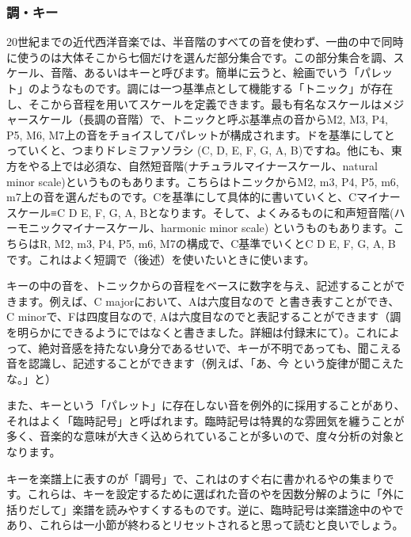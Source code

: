 \documentclass[11pt]{ltjarticle}
\newcommand{\wc}{\writechord}
\begin{document}
\subsubsection{調・キー}
20世紀までの近代西洋音楽では、半音階のすべての音を使わず、一曲の中で同時に使うのは大体そこから七個だけを選んだ部分集合です。この部分集合を調、スケール、音階、あるいはキーと呼びます。簡単に云うと、絵画でいう「パレット」のようなものです。調には一つ基準点として機能する「トニック」が存在し、そこから音程を用いてスケールを定義できます。最も有名なスケールはメジャースケール（長調の音階）で、トニックと呼ぶ基準点の音からM2, M3, P4, P5, M6, M7上の音をチョイスしてパレットが構成されます。ドを基準にしてとっていくと、つまりドレミファソラシ (C, D, E, F, G, A, B)ですね。他にも、東方をやる上では必須な、自然短音階(ナチュラルマイナースケール、natural minor scale)というものもあります。こちらはトニックからM2, m3, P4, P5, m6, m7上の音を選んだものです。Cを基準にして具体的に書いていくと、Cマイナースケール≡C D E\fl , F, G, A\fl , B\fl となります。そして、よくみるものに和声短音階(ハーモニックマイナースケール、harmonic minor scale) というものもあります。こちらはR, M2, m3, P4, P5, m6, M7の構成で、C基準でいくとC D E\fl , F, G, A\fl , B\na です。これはよく短調で\wc{V7}（後述）を使いたいときに使います。\par 
キーの中の音を、トニックからの音程をベースに数字を与え、記述することができます。例えば、C majorにおいて、Aは六度目なので と書き表すことができ、C minorで、Fは四度目なので, A\fl は六度目なので\fl {}と表記することができます（調を明らかにできるようにではなくと書きました。詳細は付録末にて）。これによって、絶対音感を持たない身分であるせいで、キーが不明であっても、聞こえる音を認識し、記述することができます（例えば、「あ、今\na {}  という旋律が聞こえたな。」と）\par
また、キーという「パレット」に存在しない音を例外的に採用することがあり、それはよく「臨時記号」と呼ばれます。臨時記号は特異的な雰囲気を纏うことが多く、音楽的な意味が大きく込められていることが多いので、度々分析の対象となります。\par
キーを楽譜上に表すのが「調号」で、これは\trebleclef \bassclef のすぐ右に書かれる\sh や\fl の集まりです。これらは、キーを設定するために選ばれた音の\sh や\fl を因数分解のように「外に括りだして」楽譜を読みやすくするものです。逆に、臨時記号は楽譜途中の\sh や\fl であり、これらは一小節が終わるとリセットされると思って読むと良いでしょう。
\end{document}
